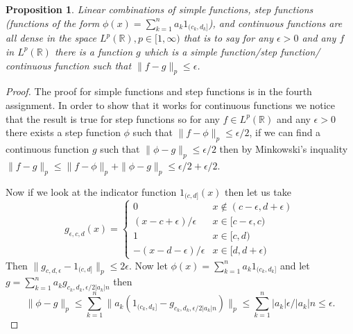 \documentclass[11pt]{article}
\newtheorem{prp}[thm]{Proposition}
\theoremstyle{definition}
\theoremstyle{remark}
\newtheorem{ex}[thm]{Example}
\begin{document}
\begin{prp}
Linear combinations of simple functions, step functions (functions of the form $\phi(x) = \sum_{k=1}^n a_k 1_{(c_k,d_k]}$), and continuous functions are all dense in the space $L^p(\mathbb{R}), p \in [1,\infty)$ that is to say for any $\epsilon > 0$ and any $f$ in $L^p(\mathbb{R})$ there is a function $g$ which is a simple function/step function/ continuous function such that $\|f-g\|_p \leq \epsilon$.
\end{prp}
\begin{proof}
The proof for simple functions and step functions is in the fourth assignment. In order to show that it works for continuous functions we notice that the result is true for step functions so for any $f \in L^p(\mathbb{R})$ and any $\epsilon >0$ there exists a step function $\phi$ such that $\| f-\phi\|_p \leq \epsilon/2$, if we can find a continuous function $g$ such that $\|\phi-g\|_p \leq \epsilon/2$ then by Minkowski's inquality $\|f-g\|_p \leq \|f-\phi\|_p + \|\phi - g\|_p \leq \epsilon/2 + \epsilon/2$.

Now if we look at the indicator function $1_{(c,d]}(x)$ then let us take \[g_{\epsilon, c,d}(x) = \left\{ \begin{array}{ll} 0 & x \notin (c-\epsilon, d+\epsilon) \\ (x-c+ \epsilon)/\epsilon & x \in [c-\epsilon, c) \\ 1 & x \in [c,d) \\ -(x-d -\epsilon)/\epsilon & x \in [d, d+\epsilon) \end{array} \right. \]
Then $\|g_{c,d,\epsilon}-1_{(c,d]}\|_p \leq 2\epsilon$. Now let $\phi(x) = \sum_{k=1}^n a_k 1_{(c_k,d_k]}$ and let $g = \sum_{k=1}^n a_k g_{c_k, d_k, \epsilon/2|a_k| n}$ then
\[\| \phi - g\|_p \leq \sum_{k=1}^n \| a_k (1_{(c_k, d_k]} - g_{c_k, d_k, \epsilon/2|a_k|n})\|_p \leq \sum_{k=1}^n |a_k| \epsilon/|a_k| n \leq \epsilon.  \]
\end{proof}

\end{document}
